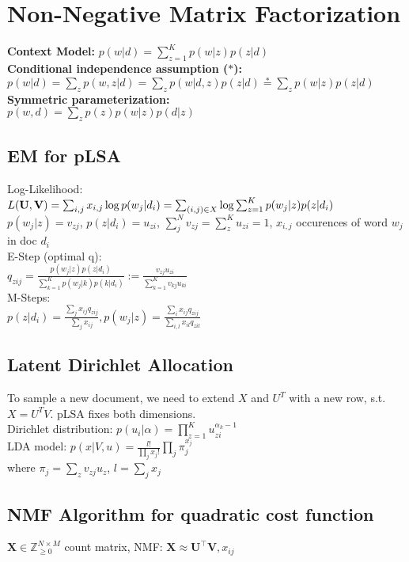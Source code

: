 \section{Non-Negative Matrix Factorization}
\textbf{Context Model:} $p(w | d) = \sum_{z=1}^K p(w | z) p(z | d)$\\
\textbf{Conditional independence assumption ($*$):}\\
$p(w|d) = \sum_z p(w,z|d) = \sum_z p(w|d,z)p(z|d) \stackrel{*}{=} \sum_z p(w|z)p(z|d)$\\
\textbf{Symmetric parameterization:}\\
$p(w, d) = \sum_z p(z)p(w | z) p(d | z)$

\subsection*{EM for pLSA}
Log-Likelihood: $L(\mathbf{U}, \mathbf{V}) = \sum_{i,j} x_{i,j}\log p(w_j|d_i) \\
= \sum_{(i,j) \in X} \log \sum_{z=1}^K p(w_j|z)p(z|d_i)$ \\ 
$ p(w_j|z) = v_{zj}$, $p(z|d_i) = u_{zi}$, $\sum_j^N v_{zj} = \sum_z^K u_{zi} = 1$, $x_{i,j}$ occurences of word $w_j$ in doc $d_i$\\
E-Step (optimal q):\\
$q_{zij} = \frac{p(w_j|z)p(z|d_i)}{\sum_{k=1}^K p(w_j|k)p(k|d_i)} := \frac{v_{zj}u_{zi}}{\sum_{k=1}^K v_{kj}u_{ki}}$\\
M-Steps:\\
$p(z|d_i) = \frac{\sum_j x_{ij}q_{zij}}{\sum_j x_{ij}}, p(w_j|z) = \frac{\sum_i x_{ij}q_{zij}}{\sum_{i,l}x_{il}q_{zil}}$\\

\subsection*{Latent Dirichlet Allocation}
To sample a new document, we need to extend $X$ and $U^T$ with a new row, s.t. $X=U^T V$. pLSA fixes both dimensions.\\
Dirichlet distribution: $p(u_i|\alpha) = \prod_{z=1}^K u_{zi}^{\alpha_k-1}$\\
LDA model: $p(x|V,u) = \frac{l!}{\prod_j x_j!}\prod_j \pi_j^{x_j}$\\
where $\pi_j=\sum_z v_{zj} u_z$, $l=\sum_j x_j$

\subsection*{NMF Algorithm for quadratic cost function}
$\mathbf{X} \in \mathbb{Z}^{N \times M}_{\geq 0}$ count matrix, NMF: $\mathbf{X} \approx \mathbf{U^\top V}, x_{ij}$

